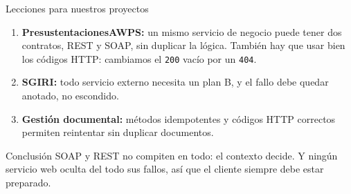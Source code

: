 \begin{frame}{Lecciones para nuestros proyectos}
\begin{enumerate}
\item \textbf{PresustentacionesAWPS:} un mismo servicio de negocio puede tener dos contratos, REST y SOAP, sin duplicar la lógica. También hay que usar bien los códigos HTTP: cambiamos el \texttt{200} vacío por un \texttt{404}.
\item \textbf{SGIRI:} todo servicio externo necesita un plan B, y el fallo debe quedar anotado, no escondido.
\item \textbf{Gestión documental:} métodos idempotentes y códigos HTTP correctos permiten reintentar sin duplicar documentos.
\end{enumerate}
\vspace{10pt}
\begin{block}{Conclusión}
SOAP y REST no compiten en todo: el contexto decide. Y ningún servicio web oculta del todo sus fallos, así que el cliente siempre debe estar preparado.
\end{block}
\end{frame}
